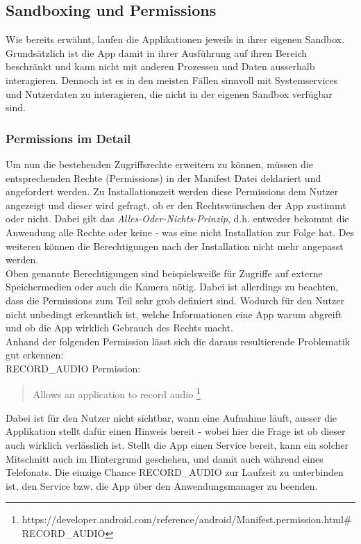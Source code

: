 	\subsection{Sandboxing und Permissions} \label{sec:SandBoxingNPermissions}
	Wie bereits erwähnt, laufen die Applikationen jeweils in ihrer eigenen Sandbox. Grundsätzlich ist die App damit in ihrer Ausführung auf ihren Bereich beschränkt und kann nicht mit anderen Prozessen und Daten ausserhalb interagieren. Dennoch ist es in den meisten Fällen sinnvoll mit Systemservices und Nutzerdaten zu interagieren, die nicht in der eigenen Sandbox verfügbar sind. 
	
	\subsubsection{Permissions im Detail}
	Um nun die bestehenden Zugriffsrechte erweitern zu können, müssen die entsprechenden Rechte (Permissions) in der Manifest Datei deklariert und angefordert werden. Zu Installationszeit werden diese Permissions dem Nutzer angezeigt und dieser wird gefragt, ob er den Rechtswünschen der App zustimmt oder nicht. Dabei gilt das \textit{Alles-Oder-Nichts-Prinzip}, d.h. entweder bekommt die Anwendung alle Rechte oder keine - was eine nicht Installation zur Folge hat. Des weiteren können die Berechtigungen nach der Installation nicht mehr angepasst werden.\\
	Oben genannte Berechtigungen sind beispielsweiße für Zugriffe auf externe Speichermedien oder auch die Kamera nötig. Dabei ist allerdings zu beachten, dass die Permissions zum Teil sehr grob definiert sind. Wodurch für den Nutzer nicht unbedingt erkenntlich ist, welche Informationen eine App warum abgreift und ob die App wirklich Gebrauch des Rechts macht.\\
	Anhand der folgenden Permission lässt sich die daraus resultierende Problematik gut erkennen:\\
	RECORD\_AUDIO Permission:
	\begin{quote}
	Allows an application to record audio \footnote{https://developer.android.com/reference/android/Manifest.permission.html\#RECORD\_AUDIO}
	\end{quote} 
	Dabei ist für den Nutzer nicht sichtbar, wann eine Aufnahme läuft, ausser die Applikation stellt dafür einen Hinweis bereit - wobei hier die Frage ist ob dieser auch wirklich verlässlich ist. Stellt die App einen Service bereit, kann ein solcher Mitschnitt auch im Hintergrund geschehen, und damit auch während eines Telefonats. Die einzige Chance RECORD\_AUDIO zur Laufzeit zu unterbinden ist, den Service bzw. die App über den Anwendungsmanager zu beenden.\\
